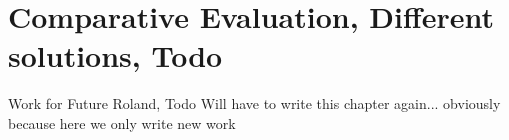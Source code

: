 \section{Comparative Evaluation, Different solutions, Todo}


Work for Future Roland, Todo
Will have to write this chapter again... obviously because here we only write new work